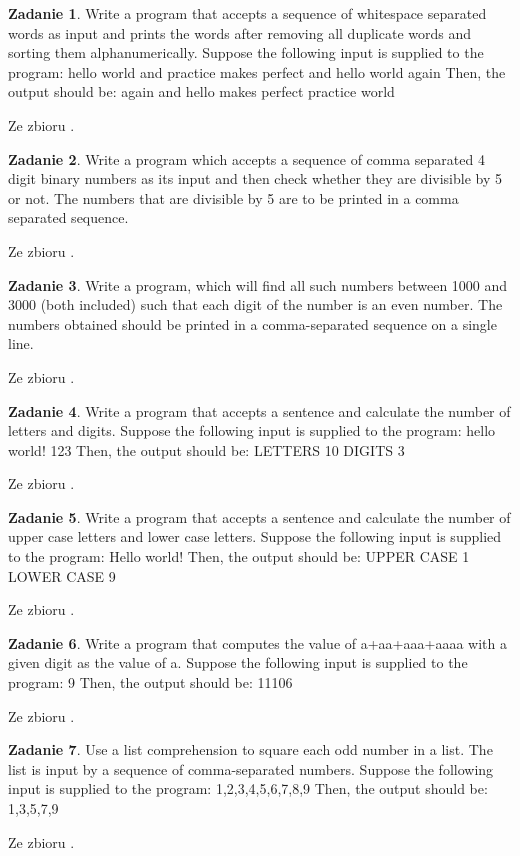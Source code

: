 \documentclass[11pt]{article}
\theoremstyle{definition}
\newtheorem{zadanie}{Zadanie}
\newcommand{\fromA}{\small Ze zbioru \cite{python100}.}
\begin{document}
\begin{zadanie}
Write a program that accepts a sequence of whitespace separated words as input and prints the words after removing all duplicate words and sorting them alphanumerically.
Suppose the following input is supplied to the program:
hello world and practice makes perfect and hello world again
Then, the output should be:
again and hello makes perfect practice world

\fromA
\end{zadanie}
\begin{zadanie}
Write a program which accepts a sequence of comma separated 4 digit binary numbers as its input and then check whether they are divisible by 5 or not. The numbers that are divisible by 5 are to be printed in a comma separated sequence.

\fromA
\end{zadanie}
\begin{zadanie}
Write a program, which will find all such numbers between 1000 and 3000 (both included) such that each digit of the number is an even number.
The numbers obtained should be printed in a comma-separated sequence on a single line.

\fromA
\end{zadanie}
\begin{zadanie}
Write a program that accepts a sentence and calculate the number of letters and digits.
Suppose the following input is supplied to the program:
hello world! 123
Then, the output should be:
LETTERS 10
DIGITS 3

\fromA
\end{zadanie}
\begin{zadanie}
Write a program that accepts a sentence and calculate the number of upper case letters and lower case letters.
Suppose the following input is supplied to the program:
Hello world!
Then, the output should be:
UPPER CASE 1
LOWER CASE 9

\fromA
\end{zadanie}
\begin{zadanie}
Write a program that computes the value of a+aa+aaa+aaaa with a given digit as the value of a.
Suppose the following input is supplied to the program:
9
Then, the output should be:
11106

\fromA
\end{zadanie}
\begin{zadanie}
Use a list comprehension to square each odd number in a list. The list is input by a sequence of comma-separated numbers.
Suppose the following input is supplied to the program:
1,2,3,4,5,6,7,8,9
Then, the output should be:
1,3,5,7,9

\fromA
\end{zadanie}
\end{document}
